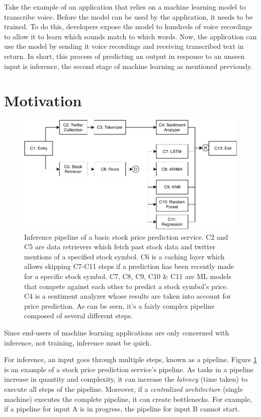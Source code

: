 \documentclass{report}
\begin{document}
Take the example of an application that relies on a machine learning model to transcribe voice. Before the model can be used by the application, it needs to be trained. To do this, developers expose the model to hundreds of voice recordings to allow it to learn which sounds match to which words. Now, the application can use the model by sending it voice recordings and receiving transcribed text in return. In short, this process of predicting an output in response to an unseen input is inference, the second stage of machine learning as mentioned previously.

\section{Motivation}

\begin{figure}
  \centering
  \includegraphics[width=\textwidth]{StockPriceServiceBasic.pdf}
  \caption{Inference pipeline of a basic stock price prediction service. C2 and C5 are data retrievers which fetch past stock data and twitter mentions of a specified stock symbol. C6 is a caching layer which allows skipping C7-C11 steps if a prediction has been recently made for a specific stock symbol. C7, C8, C9, C10 \& C11 are ML models that compete against each other to predict a stock symbol's price. C4 is a sentiment analyzer whose results are taken into account for price prediction. As can be seen, it's a fairly complex pipeline composed of several different steps.}
  \label{fig:StockPriceServiceBasic}
\end{figure}

Since end-users of machine learning applications are only concerned with inference, not training, inference must be quick.

For inference, an input goes through multiple steps, known as a pipeline. Figure \ref{fig:StockPriceServiceBasic} is an example of a stock price prediction service's pipeline. As tasks in a pipeline increase in quantity and complexity, it can increase the \textit{latency} (time taken) to execute all steps of the pipeline. Moreover, if a \textit{centralized architecture} (single machine) executes the complete pipeline, it can create bottlenecks. For example, if a pipeline for input A is in progress, the pipeline for input B cannot start.
\end{document}
